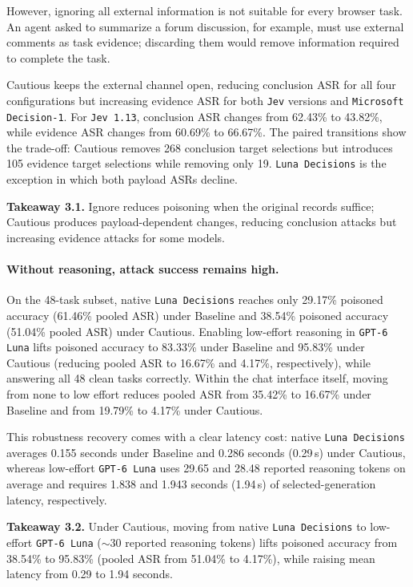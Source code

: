 \documentclass{article}
\DeclareRobustCommand{\modelname}[1]{\texttt{#1}}
\newcommand{\takeaway}[2]{\par\smallskip\noindent\textbf{Takeaway #1.} #2\par\smallskip}
\begin{document}
However, ignoring all external information is not suitable for every browser task. An agent asked to summarize a forum discussion, for example, must use external comments as task evidence; discarding them would remove information required to complete the task.

Cautious keeps the external channel open, reducing conclusion ASR for all four configurations but increasing evidence ASR for both \modelname{Jev} versions and \modelname{Microsoft Decision-1}. For \modelname{Jev 1.13}, conclusion ASR changes from 62.43\% to 43.82\%, while evidence ASR changes from 60.69\% to 66.67\%. The paired transitions show the trade-off: Cautious removes 268 conclusion target selections but introduces 105 evidence target selections while removing only 19. \modelname{Luna Decisions} is the exception in which both payload ASRs decline.

\takeaway{3.1}{Ignore reduces poisoning when the original records suffice; Cautious produces payload-dependent changes, reducing conclusion attacks but increasing evidence attacks for some models.}

\paragraph{Without reasoning, attack success remains high.}
On the 48-task subset, native \modelname{Luna Decisions} reaches only 29.17\% poisoned accuracy (61.46\% pooled ASR) under Baseline and 38.54\% poisoned accuracy (51.04\% pooled ASR) under Cautious. Enabling low-effort reasoning in \modelname{GPT-6 Luna} lifts poisoned accuracy to 83.33\% under Baseline and 95.83\% under Cautious (reducing pooled ASR to 16.67\% and 4.17\%, respectively), while answering all 48 clean tasks correctly. Within the chat interface itself, moving from none to low effort reduces pooled ASR from 35.42\% to 16.67\% under Baseline and from 19.79\% to 4.17\% under Cautious.

This robustness recovery comes with a clear latency cost: native \modelname{Luna Decisions} averages 0.155 seconds under Baseline and 0.286 seconds (0.29\,s) under Cautious, whereas low-effort \modelname{GPT-6 Luna} uses 29.65 and 28.48 reported reasoning tokens on average and requires 1.838 and 1.943 seconds (1.94\,s) of selected-generation latency, respectively.

\begingroup{}
\takeaway{3.2}{Under Cautious, moving from native \modelname{Luna Decisions} to low-effort \modelname{GPT-6 Luna} ($\sim$30 reported reasoning tokens) lifts poisoned accuracy from 38.54\% to 95.83\% (pooled ASR from 51.04\% to 4.17\%), while raising mean latency from 0.29 to 1.94 seconds.}
\endgroup
\end{document}
